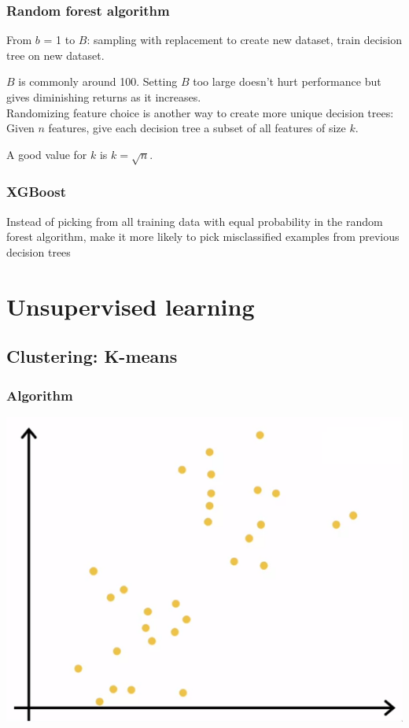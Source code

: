 \documentclass[12pt]{article}
\begin{document}
\subsubsection{Random forest algorithm}

From $b$ = 1 to $B$: sampling with replacement to create new dataset, train decision tree on new dataset.

$B$ is commonly around 100. Setting $B$ too large doesn't hurt performance but gives diminishing returns
as it increases.\\

Randomizing feature choice is another way to create more unique decision trees:
Given $n$ features, give each decision tree a subset of all features of size $k$.

A good value for $k$ is $k = \sqrt n$.

\subsubsection{XGBoost}

Instead of picking from all training data with equal probability in the random forest algorithm,
make it more likely to pick misclassified examples from previous decision trees

\section{Unsupervised learning}

\subsection{Clustering: K-means}

\subsubsection{Algorithm}

\includegraphics[scale=.5]{images/clusters.png}
\end{document}
